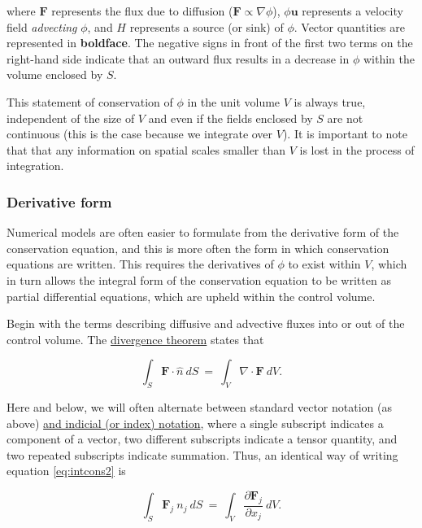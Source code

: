 where ${\mathbf F}$ represents the flux due to diffusion
($\mathbf{F} \propto \nabla \phi$), $\phi {\mathbf u}$ represents a velocity field 
\emph{advecting} $\phi$, and $H$ represents a source (or sink) of $\phi$. Vector quantities are
represented in \textbf{boldface}. The negative signs in front of the first two terms on the right-hand 
side indicate that an outward flux results in a decrease in $\phi$ within the volume enclosed by $S$.

This statement of conservation of $\phi$ in the unit volume $V$ is always true, independent of the 
size of $V$ and even if the fields enclosed by $S$ are not continuous (this is the case because we
integrate over $V$). It is important to note that that any information on spatial scales smaller than $V$ 
is lost in the process of integration.

\subsubsection{Derivative form}

Numerical models are often easier to formulate from the derivative form of the conservation equation, and this
is more often the form in which conservation equations are written. This requires the derivatives of $\phi$ to exist 
within $V$, which in turn allows the integral form of the conservation equation to be written as partial differential 
equations, which are upheld within the control volume.

Begin with the terms describing diffusive and advective fluxes into or out of the control volume. The
\href{http://en.wikipedia.org/wiki/Divergence_theorem}{divergence theorem} states that

\begin{equation}
{ \int }_{S} {\mathbf F} {\cdot} \hat{n} ~dS~ = ~{ \int }_{V} \nabla 
    {\cdot} {\mathbf F} ~dV. 
    \label{eq:intcons2}
\end{equation}

Here and below, we will often alternate between standard vector notation (as above) \href{http://en.wikipedia.org/wiki/Index_notation}{and 
indicial (or index) notation}, where a single subscript indicates a component of a vector, two different subscripts indicate a tensor quantity, 
and two repeated subscripts indicate summation. Thus, an identical way of writing equation \eqref{eq:intcons2} is 

\begin{equation}
{ \int }_{ S} {\mathbf F}_{ j} ~n_{ j} ~dS~ = ~{ \int }_{ V} {\frac{
    \partial {\mathbf F}_{ j} }{ \partial x_{ j} }} ~dV.
\end{equation}

